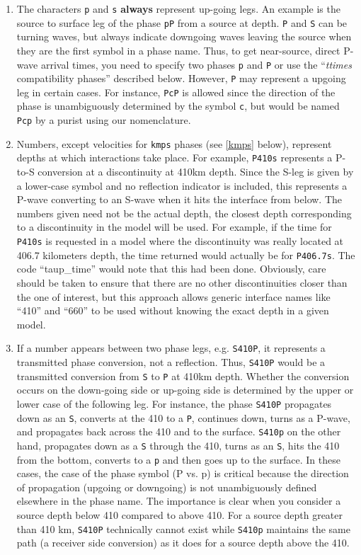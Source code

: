 \begin{enumerate}
\item The characters \texttt{p} and \texttt{s} \textbf{always} represent 
up-going legs. 
An example is the source to surface leg of the phase \texttt{pP}
from a source at depth. 
\texttt{P} and \texttt{S} can be turning waves, but 
always indicate downgoing waves leaving the source when they are the first symbol in a
phase name.
Thus, to get near-source, direct P-wave arrival times, you need to specify two
phases \texttt{p} and \texttt{P} or use the ``\textit{ttimes} compatibility phases'' described
below.
However, \texttt{P} may
represent a upgoing leg in certain cases.  
For instance, \texttt{PcP} is 
allowed since the direction of the phase is unambiguously determined by the symbol
\texttt{c}, but would be named \texttt{Pcp} by a purist using our nomenclature.

\item Numbers, except velocities for \texttt{kmps} 
phases (see \ref{kmps} below), 
represent depths at which interactions take place. 
For example, \texttt{P410s} represents a P-to-S conversion at a discontinuity at 410km
depth.  
Since the S-leg is given by a lower-case symbol and no reflection indicator is
included, this represents a P-wave  converting to an S-wave when it hits the interface
from below.
The numbers given need not be the actual depth, the closest depth corresponding to a 
discontinuity in the model will be used. 
For example, if the time for \texttt{P410s} is requested in a model where the discontinuity 
was really located at 406.7 kilometers depth, the time returned would actually be for
\texttt{P406.7s}.
The code ``taup\_time'' would note that this had been done.
Obviously, care should be taken to ensure that there are no other discontinuities 
closer than the one of interest, but this approach allows generic interface
names like ``410'' and ``660'' to be used without knowing the exact depth in a given
model.

\item If a number appears between two phase legs, e.g. \texttt{S410P}, 
it represents a transmitted phase conversion, not a reflection. 
Thus, \texttt{S410P} would be a transmitted conversion
from \texttt{S} to \texttt{P} at 410km depth.
Whether the conversion occurs
on the down-going side or up-going side is determined by the upper or lower 
case of the following leg. 
For instance, the phase \texttt{S410P} 
propagates down as an \texttt{S}, converts at the 410 
to a \texttt{P}, continues down, turns as a P-wave, and propagates back across the 
410 and to the surface. 
\texttt{S410p} on the other hand, propagates down 
as a \texttt{S} through the 410, turns as an \texttt{S}, 
hits the 410 from the bottom, converts to a \texttt{p} and then goes up to the surface. 
In these cases, the case of the phase symbol (P vs. p) is critical because the direction
of propagation (upgoing or downgoing) is not unambiguously defined elsewhere in the
phase name.  
The importance is clear when you consider a source depth below 410 compared to above 410.  
For a source depth greater than 410 km, \texttt{S410P} technically cannot exist while
\texttt{S410p} maintains the same path (a receiver side conversion) as it does for a
source depth above the 410.


\end{enumerate}
